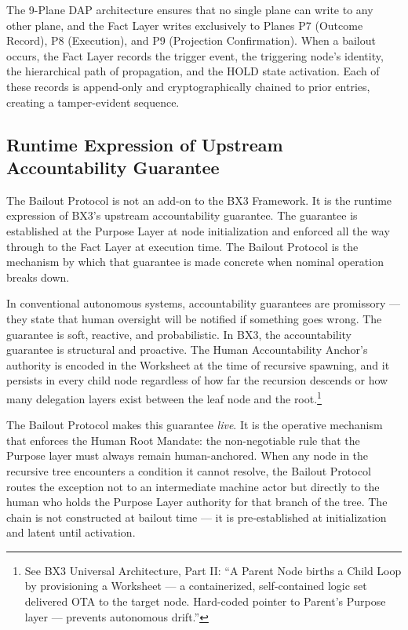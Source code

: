 The 9-Plane DAP architecture ensures that no single plane can write to any other plane, and the Fact Layer writes exclusively to Planes P7 (Outcome Record), P8 (Execution), and P9 (Projection Confirmation). When a bailout occurs, the Fact Layer records the trigger event, the triggering node's identity, the hierarchical path of propagation, and the HOLD state activation. Each of these records is append-only and cryptographically chained to prior entries, creating a tamper-evident sequence.

\subsection{Runtime Expression of Upstream Accountability Guarantee}

The Bailout Protocol is not an add-on to the BX3 Framework. It is the runtime expression of BX3's upstream accountability guarantee. The guarantee is established at the Purpose Layer at node initialization and enforced all the way through to the Fact Layer at execution time. The Bailout Protocol is the mechanism by which that guarantee is made concrete when nominal operation breaks down.

In conventional autonomous systems, accountability guarantees are promissory --- they state that human oversight will be notified if something goes wrong. The guarantee is soft, reactive, and probabilistic. In BX3, the accountability guarantee is structural and proactive. The Human Accountability Anchor's authority is encoded in the Worksheet at the time of recursive spawning, and it persists in every child node regardless of how far the recursion descends or how many delegation layers exist between the leaf node and the root.\footnote{See BX3 Universal Architecture, Part II: ``A Parent Node births a Child Loop by provisioning a Worksheet --- a containerized, self-contained logic set delivered OTA to the target node. Hard-coded pointer to Parent's Purpose layer --- prevents autonomous drift.''}

The Bailout Protocol makes this guarantee \emph{live}. It is the operative mechanism that enforces the Human Root Mandate: the non-negotiable rule that the Purpose layer must always remain human-anchored. When any node in the recursive tree encounters a condition it cannot resolve, the Bailout Protocol routes the exception not to an intermediate machine actor but directly to the human who holds the Purpose Layer authority for that branch of the tree. The chain is not constructed at bailout time --- it is pre-established at initialization and latent until activation.

